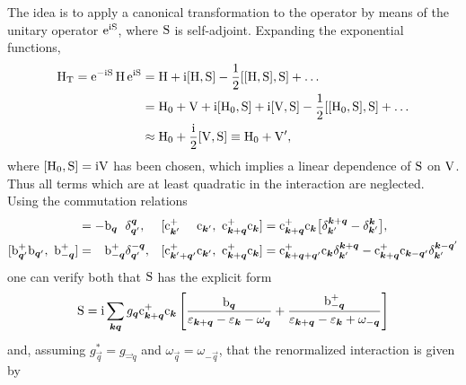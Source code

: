 The idea is to apply a canonical transformation to the  operator
by means of the unitary operator $\mathrm e^{\mathrm i \mathrm S}$, where $\mathrm S$ is self-adjoint.
Expanding the exponential functions,
%
\begin{align*}
    \mathrm H \sb{\text{T}}
    = \mathrm e^{-\mathrm i \mathrm S} \, \mathrm H \, \mathrm e^{\mathrm i \mathrm S}
    &= \mathrm H + \mathrm i [\mathrm H, \mathrm S] - \frac 1 2 [[\mathrm H, \mathrm S], \mathrm S] + \dots \\
    &= \mathrm H_0 + \mathrm V + \mathrm i [\mathrm H_0, \mathrm S] + \mathrm i [\mathrm V, \mathrm S]
    - \frac 1 2 [[\mathrm H_0, \mathrm S], \mathrm S] + \dots \\
    &\approx \mathrm H_0 + \frac {\mathrm i} 2 [\mathrm V, \mathrm S] \equiv \mathrm H_0 + \mathrm V',
\end{align*}
%
where $[\mathrm H_0, \mathrm S] = \mathrm i \mathrm V$ has been chosen, which implies a linear
dependence of $\mathrm S$ on $\mathrm V$. Thus all terms which are at least quadratic in
the interaction are neglected. Using the commutation relations
%
\begin{align*}
    [\op b_{\vec q'}^+ \op b_{\vec q'}, \ \op b_{\vec q \phantom +}]
    &= -\op b_{\vec q \phantom +} \delta_{\vec q'}^{\vec q},
    &
    [ \op c_{\vec k' \phantom{+ \vec q'}}^+ \op c_{\vec k'},
    \ \op c_{\vec k + \vec q}^+ \op c_{\vec k} ]
    &= \op c_{\vec k + \vec q}^+ \op c_{\vec k}
    \big[ \delta_{\vec k'}^{\vec k + \vec q} - \delta_{\vec k'}^{\vec k} \big],
    \\
    [\op b_{\vec q'}^+ \op b_{\vec q'}, \ \op b_{-\vec q}^+]
    &= \phantom + \op b_{-\vec q}^+ \delta_{\vec q'}^{-\vec q},
    &
    [ \op c_{\vec k' + \vec q'}^+ \op c_{\vec k'},
    \  \op c_{\vec k  + \vec q }^+ \op c_{\vec k } ]
    &= \op c_{\vec k + \vec q + \vec q'}^+ \op c_{\vec k}
    \delta_{\vec k'}^{\vec k + \vec q}
    - \op c_{\vec k + \vec q}^+ \op c_{\vec k - \vec q'}
    \delta_{\vec k'}^{\vec k - \vec q'}
\end{align*}
%
one can verify both that $\mathrm S$ has the explicit form
%
\begin{equation*}
    \mathrm S = \mathrm i \sum_{\boldsymbol k \boldsymbol q} g_{\boldsymbol q}
    \mathrm c_{\boldsymbol k + \boldsymbol q}^+ \mathrm c_{\boldsymbol k} \left[
        \frac {\mathrm b_{\boldsymbol q}}
        {\varepsilon_{\boldsymbol k + \boldsymbol q} - \varepsilon_{\boldsymbol k} - \omega_{\boldsymbol q}}
        + \frac {\mathrm b_{-\boldsymbol q}^+}
        {\varepsilon_{\boldsymbol k + \boldsymbol q} - \varepsilon_{\boldsymbol k} + \omega_{-\boldsymbol q}}
    \right]
\end{equation*}
%
and, assuming $g_{\vec q}^* = g_{\vec - q}$ and $\omega_{\vec q} = \omega_{-\vec
q}$, that the renormalized interaction is given by
%
